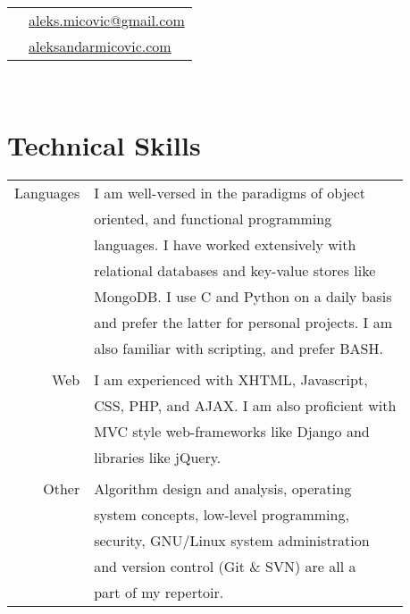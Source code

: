 \documentclass[10pt]{article}
\begin{document}
\begin{minipage}[t]{0.44\textwidth}

    \vspace{0pt}
	
\colorbox{shade}{\textcolor{text1}{
    \begin{tabular}{c|p{7cm}}
        \raisebox{-3pt}{\Envelope}
        &\href{mailto:aleks.micovic@gmail.com}{aleks.micovic@gmail.com}\\
		\raisebox{-3pt}{\PencilRightDown}
		&\href{http://aleksandarmicovic.com}{aleksandarmicovic.com}
	\end{tabular}}}\\[10pt]

\section{Technical Skills}
    \begin{tabular}{rl}
    Languages &  I am well-versed in the paradigms of object\\
              &  oriented, and functional programming\\
              &  languages. I have worked extensively with\\
              &  relational databases and key-value stores like\\
              &  MongoDB. I use C and Python on a daily basis\\
              &  and prefer the latter for personal projects. I am\\ 
              &  also familiar with scripting, and prefer BASH.\\ 
              \\
	Web   &  I am experienced with XHTML, Javascript,\\
              &  CSS, PHP, and AJAX. I am also proficient with\\ 
              &  MVC style web-frameworks like Django and\\
              &  libraries like jQuery.\\
              \\
    Other     &  Algorithm design and analysis, operating\\
              &  system concepts, low-level programming, \\
              &  security, GNU/Linux system administration\\
              &  and version control (Git \& SVN) are all a\\ 
              &  part of my repertoir.\\
    \end{tabular}\\[10pt]


\end{minipage}
\end{document}
